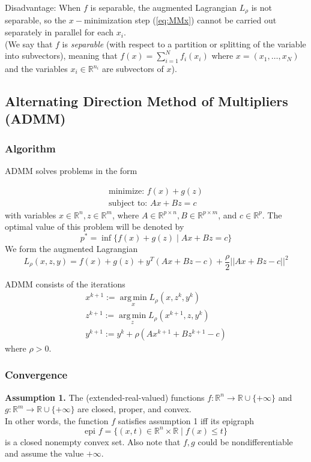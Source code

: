 \documentclass{article}
\newcommand{\R}{{\mathbb{R}}}
\DeclareMathOperator*{\argmin}{arg\,min}
\begin{document}
Disadvantage: When $f$ is separable, the augmented Lagrangian $L_{\rho}$ is not separable, so the $x-$minimization step (\ref{eq:MMx}) cannot be carried out separately in parallel for each $x_i$.\\
(We say that $f$ is \textit{separable} (with respect to a partition or splitting of the variable into subvectors), meaning that $f(x) = \sum_{i=1}^N f_i(x_i)$ where $x = (x_1, \ldots, x_N)$ and the variables $x_i \in \R^{n_i}$ are subvectors of $x$).

\subsection{Alternating Direction Method of Multipliers (ADMM)}
\subsubsection{Algorithm}
ADMM solves problems in the form 

\begin{equation} \label{eq:3.1}
\begin{array}{l}
\textrm{minimize:	 } f(x)+g(z) \\
\textrm{subject to:  } Ax + Bz = c
\end{array}
\end{equation}
with variables $x \in \R^n, z \in \R^m$, where $A \in \R^{p \times n}, B \in \R^{p \times m}$, and $c \in \R^p$. The optimal value of this problem will be denoted by
$$p^* = \inf \{f(x)+g(z) \mid Ax + Bz = c \}$$
We form the augmented Lagrangian
$$L_{\rho}(x,z,y) = f(x)+g(z) + y^T(Ax+Bz-c) + \dfrac{\rho}{2}||Ax+Bz-c||^2$$

ADMM consists of the iterations
\begin{equation} 
\begin{array}{l}
x^{k+1} := \argmin\limits_x L_{\rho}(x,z^k,y^k)\\
z^{k+1} := \argmin\limits_z L_{\rho}(x^{k+1},z,y^k)\\
y^{k+1} := y^k + \rho(Ax^{k+1} + Bz^{k+1}-c)
\end{array}
\end{equation}
where $\rho > 0$.

\subsubsection{Convergence}
\textbf{Assumption 1.} The (extended-real-valued) functions $f:\R^n \rightarrow \R \cup \{+\infty\}$ and $g: \R^m \rightarrow \R \cup \{+\infty\}$ are closed, proper, and convex.\\
In other words, the function $f$ satisfies assumption 1 iff its epigraph 
$$\text{epi } f = \{(x,t) \in \R^n \times \R \mid f(x) \le t\}$$ is a closed nonempty convex set. Also note that $f,g$ could be nondifferentiable and assume the value $+\infty$.\\
\end{document}
